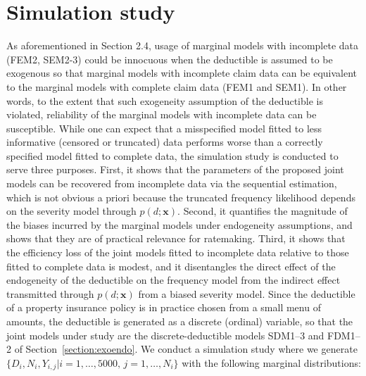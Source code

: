 \documentclass[11pt]{article}
\begin{document}




\section{Simulation study}
\label{sec:simulation}
As aforementioned in Section 2.4, usage of marginal models with incomplete data (FEM2, SEM2-3) could be innocuous when the deductible is assumed to be exogenous so that marginal models with incomplete claim data can be equivalent to the marginal models with complete claim data (FEM1 and SEM1). In other words, to the extent that such exogeneity assumption of the deductible is violated, reliability of the marginal models with incomplete data can be susceptible. While one can expect that a misspecified model fitted to less informative (censored or truncated) data performs worse than a correctly specified model fitted to complete data, the simulation study is conducted to serve three purposes. First, it shows that the parameters of the proposed joint models can be recovered from incomplete data via the sequential estimation, which is not obvious a priori because the truncated frequency likelihood depends on the severity model through $p(d;\bm{x})$. Second, it quantifies the magnitude of the biases incurred by the marginal models under endogeneity assumptions, and shows that they are of practical relevance for ratemaking. Third, it shows that the efficiency loss of the joint models fitted to incomplete data relative to those fitted to complete data is modest, and it disentangles the direct effect of the endogeneity of the deductible on the frequency model from the indirect effect transmitted through $p(d;\bm{x})$ from a biased severity model. Since the deductible of a property insurance policy is in practice chosen from a small menu of amounts, the deductible is generated as a discrete (ordinal) variable, so that the joint models under study are the discrete-deductible models SDM1--3 and FDM1--2 of Section~\ref{section:exoendo}.
We conduct a simulation study where we generate $\{D_i, N_{i},Y_{i,j} |i=1,\ldots, 5000, \, j=1,\ldots, N_i \}$ with the following marginal distributions:
\end{document}
